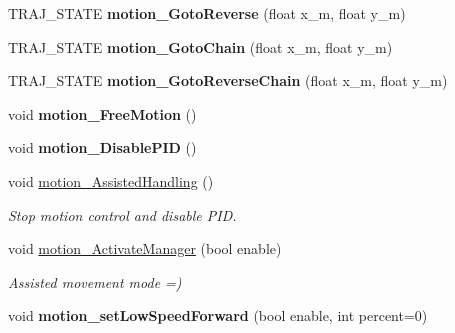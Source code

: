 \begin{DoxyCompactItemize}
\mbox{\label{classAsservDriver_a7c22c1e30e5e6c13f17051869ad6f9c8}} 
T\+R\+A\+J\+\_\+\+S\+T\+A\+TE {\bfseries motion\+\_\+\+Goto\+Reverse} (float x\+\_\+m, float y\+\_\+m)
\item 
\mbox{\label{classAsservDriver_abdc3ba07eb7741fdc868f3ae16f60175}} 
T\+R\+A\+J\+\_\+\+S\+T\+A\+TE {\bfseries motion\+\_\+\+Goto\+Chain} (float x\+\_\+m, float y\+\_\+m)
\item 
\mbox{\label{classAsservDriver_a54e7589cce70cc442b943df3c9b1818c}} 
T\+R\+A\+J\+\_\+\+S\+T\+A\+TE {\bfseries motion\+\_\+\+Goto\+Reverse\+Chain} (float x\+\_\+m, float y\+\_\+m)
\item 
\mbox{\label{classAsservDriver_aac603258c40d4c9aede0e5fce6ed4dea}} 
void {\bfseries motion\+\_\+\+Free\+Motion} ()
\item 
\mbox{\label{classAsservDriver_a0a68a702d1fea277c2e24e6dceb2d646}} 
void {\bfseries motion\+\_\+\+Disable\+P\+ID} ()
\item 
\mbox{\label{classAsservDriver_a733d0cddfdb612cea9e8097b348537f1}} 
void \hyperlink{classAsservDriver_a733d0cddfdb612cea9e8097b348537f1}{motion\+\_\+\+Assisted\+Handling} ()
\begin{DoxyCompactList}\small\item\em Stop motion control and disable P\+ID. \end{DoxyCompactList}\item 
\mbox{\label{classAsservDriver_aaeb3c80c8a079c812af38273f825c537}} 
void \hyperlink{classAsservDriver_aaeb3c80c8a079c812af38273f825c537}{motion\+\_\+\+Activate\+Manager} (bool enable)
\begin{DoxyCompactList}\small\item\em Assisted movement mode =) \end{DoxyCompactList}\item 
\mbox{\label{classAsservDriver_a179a024ddd900587e4da74521f9b7f1a}} 
void {\bfseries motion\+\_\+set\+Low\+Speed\+Forward} (bool enable, int percent=0)
\item 
\mbox{\label{classAsservDriver_a713b553740e59136151e2c6886187713}} 

\end{DoxyCompactItemize}

